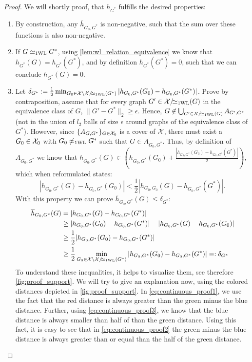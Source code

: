 \begin{proof}
    We will shortly proof, that $h_{G^*}$ fulfills the desired properties:
    \begin{enumerate}
        \item By construction, any $\overline{h}_{G_0, G^*}$ is non-negative, such that the sum over these functions is also non-negative.
        \item If $G \simeq_{\text{1WL}} G^*$, using \cref{lem:wl_relation_equivalence} we know that $h_{G^*}(G) = h_{G^*}(G^*)$, and by definition $h_{G^*}(G^*) = 0$, such that we can conclude $h_{G^*}(G)=0$.
        \item Let $\delta_{G^*} := \frac{1}{2} \min_{G_0 \in \mathcal{X} \setminus \mathcal{X}/\!{\simeq_{\text{1WL}}}(G^*)} |h_{G_0, G^*}(G_0) - h_{G_0, G^*}(G^*)|$. Prove by contraposition,  assume that for every graph $G' \in \mathcal{X}/\!{\simeq_{\text{1WL}}}(G)$ in the equivalence class of $G$, $\| G' - G^* \|_2 \geq \epsilon$. Hence, $G \not\in \bigcup_{G' \in \mathcal{X}/\!{\simeq_{\text{1WL}}}(G)} A_{G', G^*}$ (not in the union of $l_2$ balls of size $\epsilon$ around graphs of the equivalence class of $G^*$). However, since $\{ A_{G, G^*} \}_{G \in \mathcal{X}_0}$ is a cover of $\mathcal{X}$, there must exist a $G_0 \in \mathcal{X}_0$ with $G_0 \not\simeq_{\text{1WL}} G^*$ such that $G \in A_{G_0, G^*}$. Thus, by definition of $A_{G_0, G^*}$ we know that $h_{G_0, G^*}(G) \in (h_{G_0, G^*}(G_0) \pm \frac{|h_{G_0, G^*}(G_0) - h_{G_0, G^*}(G^*)|}{2})$, which when reformulated states:
        \begin{equation}\label{eq:continuous_proof3}
             |h_{G_0, G^*}(G) - h_{G_0, G^*}(G_0)| < \frac{1}{2}|h_{G_0, G_0}(G) - h_{G_0, G^*}(G^*)|.
        \end{equation}
        With this property we can prove $\overline{h}_{G_0, G^*}(G) \leq \delta_{G^*}$:
        \begin{align}
            \overline{h}_{G_0, G^*}(G) &= |h_{G_0, G^*}(G) - h_{G_0, G^*}(G^*)| \nonumber \\
            &\geq |h_{G_0, G^*}(G_0) - h_{G_0, G^*}(G^*)| - |h_{G_0, G^*}(G) - h_{G_0, G^*}(G_0)|\label{eq:continuous_proof1}\\
            &\geq \frac{1}{2} |h_{G_0, G^*}(G_0) - h_{G_0, G^*}(G^*)|\label{eq:continuous_proof2}\\
            &\geq \frac{1}{2} \min_{G_0 \in \mathcal{X} \setminus \mathcal{X}/\!{\simeq_{\text{1WL}}}(G^*)} |h_{G_0, G^*}(G_0) - h_{G_0, G^*}(G^*)| =: \delta_{G^*} \nonumber
        \end{align}
        To understand these inequalities, it helps to visualize them, see therefore \autoref{fig:proof_support}. We will try to give an explanation now, using the colored distances depicted in \autoref{fig:proof_support}. In \autoref{eq:continuous_proof1}, we use the fact that the red distance is always greater than the green minus the blue distance. Further, using \autoref{eq:continuous_proof3}, we know that the blue distance is always smaller than half of than the green distance. Using this fact, it is easy to see that in \autoref{eq:continuous_proof2} the green minus the blue distance is always greater than or equal than the half of the green distance.


\end{enumerate}
\end{proof}
